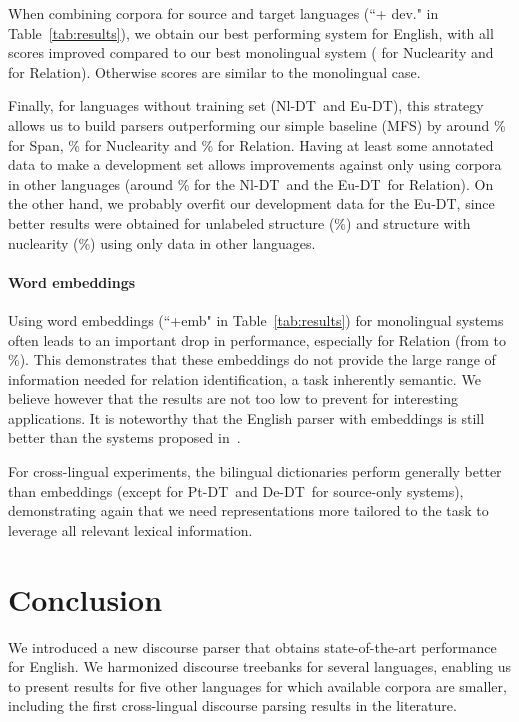 \documentclass[11pt]{article}
\newcommand{\derst}{De-DT}
\newcommand{\ptrst}{Pt-DT}
\newcommand{\eurst}{Eu-DT}
\newcommand{\nlrst}{Nl-DT}
\begin{document}
When combining corpora for source and target languages (``+ dev." in Table~\ref{tab:results}), we obtain our best performing system for English, with all scores improved compared to our best monolingual system ( for Nuclearity and  for Relation). Otherwise scores are similar to the monolingual case. 

Finally, for languages without training set (\nlrst\ and \eurst), this strategy allows us to build parsers outperforming our simple baseline (MFS) by around \% for Span, \% for Nuclearity and \% for Relation.
Having at least some annotated data to make a development set allows improvements against only using corpora in other languages (around \% for the \nlrst\ and the \eurst\ for Relation). On the other hand, we probably overfit our development data for the \eurst, since better results were obtained for unlabeled structure (\%) and structure with nuclearity (\%) using only data in other languages.

\paragraph{Word embeddings}
Using word embeddings (``+emb" in Table~\ref{tab:results}) for monolingual systems often leads to an important drop in performance, especially for Relation (from  to \%).
This demonstrates that these embeddings do not provide the large range of information needed for relation identification, a task inherently semantic.
We believe however that the results are not too low to prevent for interesting applications. 
It is noteworthy that the English parser with embeddings is still better than the systems proposed in~\cite{duverle:hilda:2010,joty:combining:2013}.

For cross-lingual experiments, the bilingual dictionaries perform generally better than embeddings (except for \ptrst\ and \derst\ for source-only systems), demonstrating again that we need representations more tailored to the task to leverage all relevant lexical information. 

\section{Conclusion}

We introduced a new discourse parser that obtains state-of-the-art performance for English. We harmonized discourse treebanks for several languages, enabling us to present results for five other languages for which available corpora are smaller, including the first cross-lingual discourse parsing results in the literature. 
\end{document}
